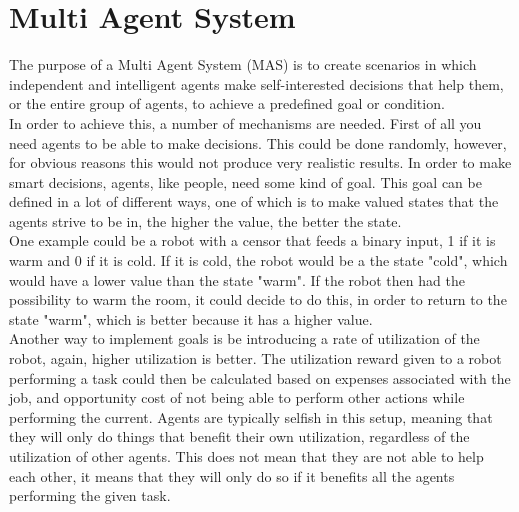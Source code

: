 \chapter{Multi Agent System}
The purpose of a Multi Agent System (MAS) is to create scenarios in which independent and intelligent agents make self-interested decisions that help them, or the entire group of agents, to achieve a predefined goal or condition.\\
\indent In order to achieve this, a number of mechanisms are needed. First of all you need agents to be able to make decisions. This could be done randomly, however, for obvious reasons this would not produce very realistic results. In order to make smart decisions, agents, like people, need some kind of goal. This goal can be defined in a lot of different ways, one of which is to make valued states that the agents strive to be in, the higher the value, the better the state.\\
\indent One example could be a robot with a censor that feeds a binary input, 1 if it is warm and 0 if it is cold. If it is cold, the robot would be a the state "cold", which would have a lower value than the state "warm". If the robot then had the possibility to warm the room, it could decide to do this, in order to return to the state "warm", which is better because it has a higher value.\\
\indent Another way to implement goals is be introducing a rate of utilization of the robot, again, higher utilization is better. The utilization reward given to a robot performing a task could then be calculated based on expenses associated with the job, and opportunity cost of not being able to perform other actions while performing the current. Agents are typically selfish in this setup, meaning that they will only do things that benefit their own utilization, regardless of the utilization of other agents. This does not mean that they are not able to help each other, it means that they will only do so if it benefits all the agents performing the given task.